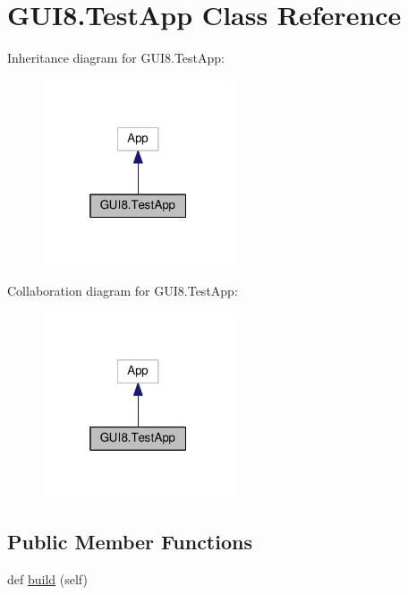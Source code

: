 \hypertarget{classGUI8_1_1TestApp}{}\section{G\+U\+I8.\+Test\+App Class Reference}
\label{classGUI8_1_1TestApp}


Inheritance diagram for G\+U\+I8.\+Test\+App\+:
\nopagebreak
\begin{figure}[H]
\begin{center}
\leavevmode
\includegraphics[width=160pt]{classGUI8_1_1TestApp__inherit__graph}
\end{center}
\end{figure}


Collaboration diagram for G\+U\+I8.\+Test\+App\+:
\nopagebreak
\begin{figure}[H]
\begin{center}
\leavevmode
\includegraphics[width=160pt]{classGUI8_1_1TestApp__coll__graph}
\end{center}
\end{figure}
\subsection*{Public Member Functions}
\begin{DoxyCompactItemize}
\item 
def \hyperlink{classGUI8_1_1TestApp_a664816e2a2642c5904acc8826e07e0a8}{build} (self)
\end{DoxyCompactItemize}
